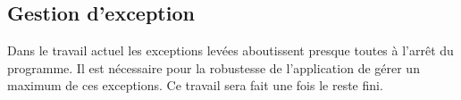 

\subsection{Gestion d'exception}
Dans le travail actuel les exceptions levées aboutissent presque toutes à l'arrêt du programme. Il est nécessaire pour la robustesse de l'application de gérer un maximum de ces exceptions. Ce travail sera fait une fois le reste fini.


